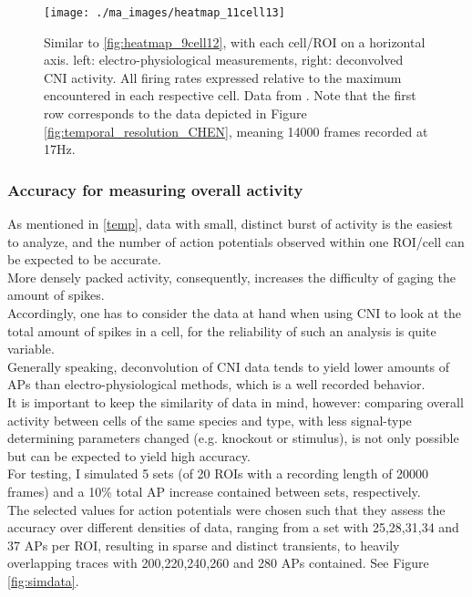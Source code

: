 \documentclass[titlepage]{article}
\begin{document}
\begin{figure}[H]
\centering
\texttt{[image: ./ma\_images/heatmap\_11cell13]}
\caption{Similar to \ref{fig:heatmap_9cell12}, with each cell/ROI on a horizontal axis. left: electro-physiological measurements, right: deconvolved CNI activity. All firing rates expressed relative to the maximum encountered in each respective cell. Data from \citeauthor{chen_ultrasensitive_2013}\cite{chen_ultrasensitive_2013}. Note that the first row corresponds to the data depicted in Figure \ref{fig:temporal_resolution_CHEN}, meaning 14000 frames recorded at 17Hz.}
\label{fig:heatmap_11cell13} 
\end{figure}

\subsubsection{Accuracy for measuring overall activity}\label{accuracy}
As mentioned in \ref{temp}, data with small, distinct burst of activity is the easiest to analyze, and the number of action potentials observed within one ROI/cell can be expected to be accurate.\\
More densely packed activity, consequently, increases the difficulty of gaging the amount of spikes.\\
Accordingly, one has to consider the data at hand when using CNI to look at the total amount of spikes in a cell, for the reliability of such an analysis is quite variable.\\
Generally speaking, deconvolution of CNI data tends to yield lower amounts of APs than electro-physiological methods, which is a well recorded behavior.\cite{orbach_optical_1985}\cite{hofer_differential_2011}\\
It is important to keep the similarity of data in mind, however: comparing overall activity between cells of the same species and type, with less signal-type determining parameters changed (e.g. knockout or stimulus), is not only possible but can be expected to yield high accuracy.\\
For testing, I simulated 5 sets (of 20 ROIs with a recording length of 20000 frames) and a 10\% total AP increase contained between sets, respectively.\\
The selected values for action potentials were chosen such that they assess the accuracy over different densities of data, ranging from a set with 25,28,31,34 and 37 APs per ROI, resulting in sparse and distinct transients, to heavily overlapping traces with 200,220,240,260 and 280 APs contained. See Figure \ref{fig:simdata}.\\
\end{document}
